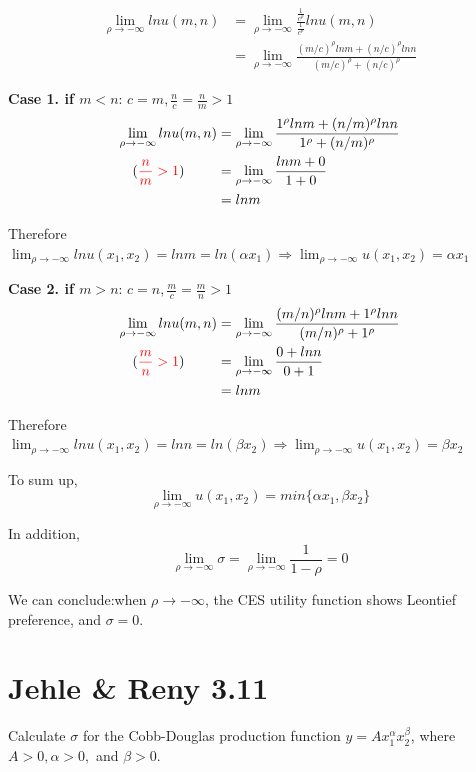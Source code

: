 \documentclass{article}
\begin{document}
\begin{mdframed}[backgroundcolor=blue!20,linecolor=white]
\begin{align*}
\lim_{\rho \to -\infty} ln u(m,n) &=  \lim_{\rho \to -\infty} \frac{\frac{1}{c^\rho}}{\frac{1}{c^\rho}} ln u(m,n)\\
&= \lim_{\rho \to -\infty} \frac{(m/c)^\rho ln m+ (n/c)^\rho ln n}{(m/c)^\rho + (n/c)^\rho}
\end{align*}

\textbf{Case 1. if $m<n$}: $c = m, \frac{n}{c} = \frac{n}{m} >1$
\begin{align*}
\lim_{\rho \to -\infty} ln u(m,n) &= \lim_{\rho \to -\infty} \frac{1^\rho ln m+ (n/m)^\rho ln n}{1^\rho + (n/m)^\rho} \\
(\textcolor{red}{\frac{n}{m} >1}) \ \ \ \ \ \ \ &= \lim_{\rho \to -\infty} \frac{ln m+ 0}{1 + 0} \\
&= ln m 
\end{align*}

Therefore $\lim_{\rho \to -\infty} ln u(x_1,x_2) =ln m = ln (\alpha x_1) \Rightarrow \lim_{\rho \to -\infty} u(x_1,x_2) =  \alpha x_1$

\vspace{2mm}

\textbf{Case 2. if $m>n$}: $c = n, \frac{m}{c} = \frac{m}{n} >1$
\begin{align*}
\lim_{\rho \to -\infty} ln u(m,n) &= \lim_{\rho \to -\infty} \frac{(m/n)^\rho ln m+ 1^\rho ln n}{(m/n)^\rho + 1^\rho} \\
(\textcolor{red}{\frac{m}{n} >1}) \ \ \ \ \ \ \ &= \lim_{\rho \to -\infty} \frac{ 0 + ln n}{0 + 1} \\
&= ln m
\end{align*}

Therefore $\lim_{\rho \to -\infty} ln u(x_1,x_2) =ln n = ln (\beta x_2) \Rightarrow \lim_{\rho \to -\infty} u(x_1,x_2) =  \beta x_2$

\vspace{2mm}


To sum up, $$\lim_{\rho \to -\infty} u(x_1,x_2) = min\{\alpha x_1,\beta x_2\}$$

In addition, $$\lim_{\rho \to -\infty} \sigma =\lim_{\rho \to -\infty} \frac{1}{1-\rho} = 0$$

We can conclude:when $\rho \to -\infty$, the CES utility function shows Leontief preference, and $\sigma = 0$.
\end{mdframed}

\section{Jehle \& Reny 3.11}
Calculate $\sigma$ for the Cobb-Douglas production function $y = Ax_1^\alpha x_2^\beta$, where $A > 0,\alpha > 0,$ and $\beta > 0$.
\end{document}
